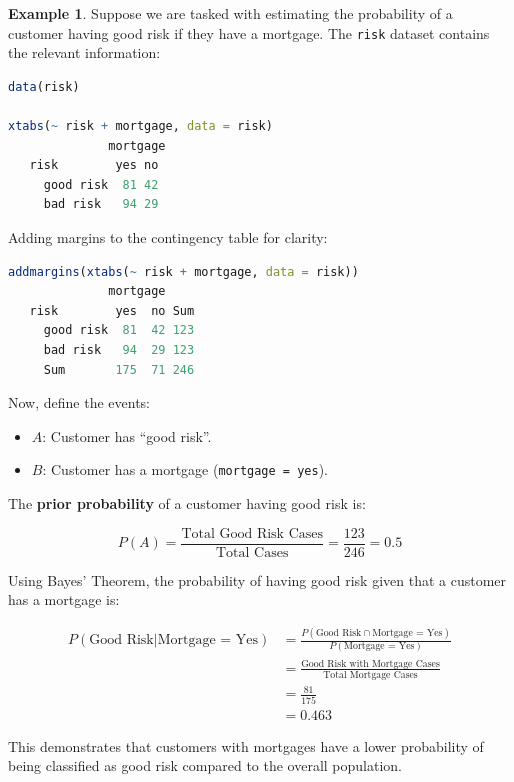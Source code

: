 \documentclass[
]{book}
\newcommand{\passthrough}[1]{#1}
\providecommand{\tightlist}{%
  \setlength{\itemsep}{0pt}\setlength{\parskip}{0pt}}
\theoremstyle{definition}
\theoremstyle{definition}
\newtheorem{example}{Example}[chapter]
\theoremstyle{definition}
\theoremstyle{definition}
\theoremstyle{remark}
\begin{document}
\begin{example}
\protect\hypertarget{exm:ex-bayes-risk}{}\label{exm:ex-bayes-risk}Suppose we are tasked with estimating the probability of a customer having good risk if they have a mortgage. The \passthrough{\lstinline!risk!} dataset contains the relevant information:

\begin{lstlisting}[language=R]
data(risk)

xtabs(~ risk + mortgage, data = risk)
              mortgage
   risk        yes no
     good risk  81 42
     bad risk   94 29
\end{lstlisting}

Adding margins to the contingency table for clarity:

\begin{lstlisting}[language=R]
addmargins(xtabs(~ risk + mortgage, data = risk))
              mortgage
   risk        yes  no Sum
     good risk  81  42 123
     bad risk   94  29 123
     Sum       175  71 246
\end{lstlisting}

Now, define the events:

\begin{itemize}
\tightlist
\item
  \(A\): Customer has ``good risk''.\\
\item
  \(B\): Customer has a mortgage (\passthrough{\lstinline!mortgage = yes!}).
\end{itemize}

The \textbf{prior probability} of a customer having good risk is:

\[
P(A) = \frac{\text{Total Good Risk Cases}}{\text{Total Cases}} = \frac{123}{246} = 0.5
\]

Using Bayes' Theorem, the probability of having good risk given that a customer has a mortgage is:

\begin{equation} 
\label{eq1}
\begin{split}
P(\text{Good Risk} | \text{Mortgage = Yes}) & = \frac{P(\text{Good Risk} \cap \text{Mortgage = Yes})}{P(\text{Mortgage = Yes})} \\
 & = \frac{\text{Good Risk with Mortgage Cases}}{\text{Total Mortgage Cases}} \\
 & = \frac{81}{175} \\
 & = 0.463
\end{split}
\end{equation}

This demonstrates that customers with mortgages have a lower probability of being classified as good risk compared to the overall population.
\end{example}
\end{document}

